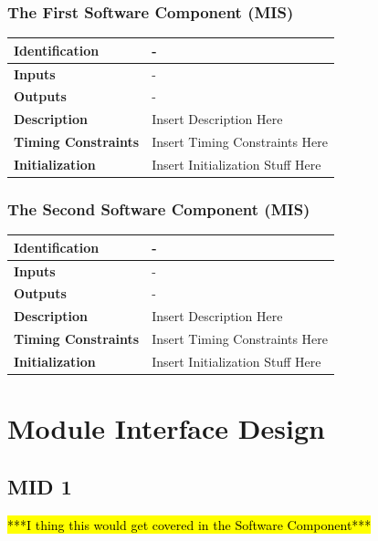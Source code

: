 \documentclass [10pt]{article}
\begin{document}
\subsubsection{The First Software Component (MIS)}
\begin{longtable}{| p{ } | p{ } | }\hline 
\textbf{Identification} & - \\ \hline
\textbf{Inputs} & - \\ \hline
\textbf{Outputs} & - \\ \hline
\textbf{Description} & Insert Description Here\\ \hline 
\textbf{Timing Constraints} & Insert Timing Constraints Here\\ \hline 
\textbf{Initialization} & Insert Initialization Stuff Here\\ \hline 
\end{longtable}

\subsubsection{The Second Software Component (MIS)}
\begin{longtable}{| p{ } | p{ } | }\hline 
\textbf{Identification} & - \\ \hline
\textbf{Inputs} & - \\ \hline
\textbf{Outputs} & - \\ \hline
\textbf{Description} & Insert Description Here\\ \hline 
\textbf{Timing Constraints} & Insert Timing Constraints Here\\ \hline 
\textbf{Initialization} & Insert Initialization Stuff Here\\ \hline 
\end{longtable}






\section{Module Interface Design}
\subsection {MID 1}

\hl{***I thing this would get covered in the Software Component***}
\end{document}
